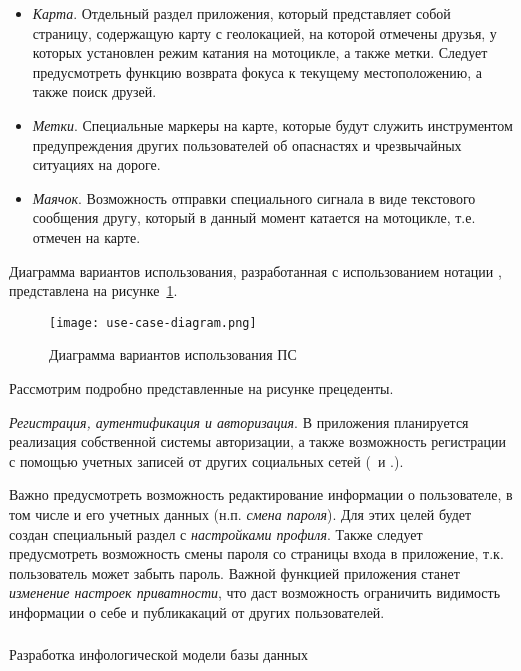\begin{itemize}
	\item \emph{Карта}. Отдельный раздел приложения, который представляет собой страницу, содержащую карту с геолокацией, на которой отмечены друзья, у которых установлен режим катания на мотоцикле, а также метки. Следует предусмотреть функцию возврата фокуса к текущему местоположению, а также поиск друзей.
	\item \emph{Метки}. Специальные маркеры на карте, которые будут служить инструментом предупреждения других пользователей об опаснастях и чрезвычайных ситуациях на дороге.
	\item \emph{Маячок}. Возможность отправки специального сигнала в виде текстового сообщения другу, который в данный момент катается на мотоцикле, т.е. отмечен на карте.
\end{itemize}

Диаграмма вариантов использования, разработанная с использованием нотации \uml, представлена на рисунке~\ref{fig:domain:model:use_cases:model}.

\begin{figure}
\centering
	\texttt{[image: use-case-diagram.png]}
	\caption{Диаграмма вариантов использования ПС}
	\label{fig:domain:model:use_cases:model}
\end{figure}

Рассмотрим подробно представленные на рисунке прецеденты.

\emph{Регистрация, аутентификация и авторизация}. В приложения планируется реализация собственной системы авторизации, а также возможность регистрации с помощью учетных записей от других социальных сетей (\facebook~и \vk.).

Важно предусмотреть возможность редактирование информации о пользователе, в том числе и его учетных данных (н.п. \emph{смена пароля}). Для этих целей будет создан специальный раздел с \emph{настройками профиля}.
Также следует предусмотреть возможность смены пароля со страницы входа в приложение, т.к. пользователь может забыть пароль.
Важной функцией приложения станет \emph{изменение настроек приватности}, что даст возможность ограничить видимость информации о себе и публикакаций от других пользователей. 


\subsubsection{} Разработка инфологической модели базы данных
\label{sec:domain:model:db}

